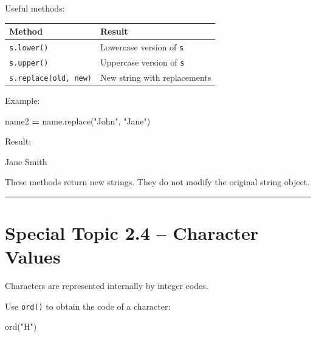\documentclass[
]{article}
\newenvironment{Shaded}{\begin{snugshade}}{\end{snugshade}}
\newcommand{\BuiltInTok}[1]{#1}
\newcommand{\NormalTok}[1]{#1}
\newcommand{\OperatorTok}[1]{\textcolor[rgb]{0.81,0.36,0.00}{\textbf{#1}}}
\newcommand{\StringTok}[1]{\textcolor[rgb]{0.31,0.60,0.02}{#1}}
\newcounter{none} %
\begin{document}
Useful methods:

{\def\LTcaptype{none} %
\begin{longtable}[]{@{}ll@{}}
\toprule\noalign{}
Method & Result \\
\midrule\noalign{}
\endhead
\bottomrule\noalign{}
\endlastfoot
\texttt{s.lower()} & Lowercase version of \texttt{s} \\
\texttt{s.upper()} & Uppercase version of \texttt{s} \\
\texttt{s.replace(old,\ new)} & New string with replacements \\
\end{longtable}
}

Example:

\begin{Shaded}
\begin{Highlighting}[]
\NormalTok{name2 }\OperatorTok{=}\NormalTok{ name.replace(}\StringTok{"John"}\NormalTok{, }\StringTok{"Jane"}\NormalTok{)}
\end{Highlighting}
\end{Shaded}

Result:

\begin{Shaded}
\begin{Highlighting}[]
\NormalTok{Jane Smith}
\end{Highlighting}
\end{Shaded}

These methods return new strings. They do not modify the original string
object.

\begin{center}\rule{0.5\linewidth}{0.5pt}\end{center}

\section{Special Topic 2.4 -- Character
Values}\label{special-topic-2.4-character-values}

Characters are represented internally by integer codes.

Use \texttt{ord()} to obtain the code of a character:

\begin{Shaded}
\begin{Highlighting}[]
\BuiltInTok{ord}\NormalTok{(}\StringTok{"H"}\NormalTok{)}
\end{Highlighting}
\end{Shaded}
\end{document}
